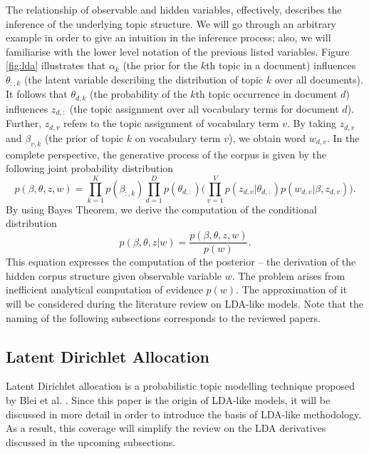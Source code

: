 \documentclass{mprop}
\begin{document}
\par The relationship of observable and hidden variables, effectively, describes the inference of the underlying topic structure. We will go through an arbitrary example in order to give an intuition in the inference process; also, we will familiarise with the lower level notation of the previous listed variables. Figure \ref{fig:lda} illustrates that $\alpha_k$ (the prior for the $k$th topic in a document) influences $\theta_{:, k}$ (the latent variable describing the distribution of topic $k$ over all documents). It follows that $\theta_{d, k}$ (the probability of the $k$th topic occurrence in document $d$) influences $z_{d, :}$ (the topic assignment over all vocabulary terms for document $d$). Further, $z_{d, v}$ refers to the topic assignment of vocabulary term $v$. By taking $z_{d, v}$ and $\beta_{v, k}$ (the prior of topic $k$ on vocabulary term $v$), we obtain word $w_{d, v}$. In the complete perspective, the generative process of the corpus is given by the following joint probability distribution
\begin{equation}
p(\beta, \theta, z, w) = \prod_{k=1}^Kp(\beta_{:, k})\prod_{d=1}^Dp(\theta_{d, :})\bigg(\prod_{v=1}^Vp(z_{d, v} | \theta_{d, :})p(w_{d, v} | \beta, z_{d, v})\bigg).
\end{equation}
By using Bayes Theorem, we derive the computation of the conditional distribution
\begin{equation}
p(\beta, \theta, z | w) = \frac{p(\beta, \theta, z, w)}{p(w)}. 
\end{equation}
This equation expresses the computation of the posterior -- the derivation of the hidden corpus structure given observable variable $w$. The problem arises from inefficient analytical computation of evidence $p(w)$. The approximation of it will be considered during the literature review on LDA-like models. Note that the naming of the following subsections corresponds to the reviewed papers. 

\subsection{Latent Dirichlet Allocation}

\par Latent Dirichlet allocation is a probabilistic topic modelling technique proposed by Blei et al. \cite{blei_2003}. Since this paper is the origin of LDA-like models, it will be discussed in more detail in order to introduce the basis of LDA-like methodology. As a result, this coverage will simplify the review on the LDA derivatives discussed in the upcoming subsections. 
\end{document}
